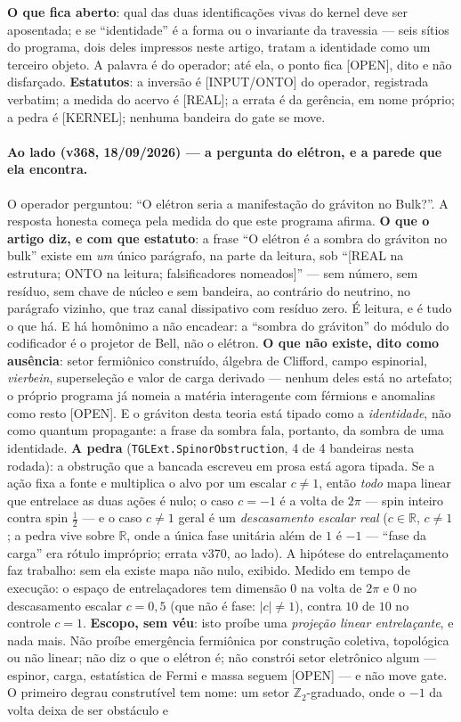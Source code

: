 \documentclass[11pt]{article}
\theoremstyle{definition}\newtheorem{deriv}{Derivação}
\begin{document}
\textbf{O que fica aberto}: qual das duas identificações vivas do kernel deve ser aposentada; e se ``identidade'' é a forma ou o invariante da travessia --- seis sítios do programa, dois deles impressos neste artigo, tratam a identidade como um terceiro objeto. A palavra é do operador; até ela, o ponto fica [OPEN], dito e não disfarçado. \textbf{Estatutos}: a inversão é [INPUT/ONTO] do operador, registrada verbatim; a medida do acervo é [REAL]; a errata é da gerência, em nome próprio; a pedra é [KERNEL]; nenhuma bandeira do gate se move.

\paragraph*{Ao lado (v368, 18/09/2026) --- a pergunta do elétron, e a parede que ela encontra.} O operador perguntou: ``O elétron seria a manifestação do gráviton no Bulk?''. A resposta honesta começa pela medida do que este programa afirma. \textbf{O que o artigo diz, e com que estatuto}: a frase ``O elétron é a sombra do gráviton no bulk'' existe em \emph{um} único parágrafo, na parte da leitura, sob ``[REAL na estrutura; ONTO na leitura; falsificadores nomeados]'' --- sem número, sem resíduo, sem chave de núcleo e sem bandeira, ao contrário do neutrino, no parágrafo vizinho, que traz canal dissipativo com resíduo zero. É leitura, e é tudo o que há. E há homônimo a não encadear: a ``sombra do gráviton'' do módulo do codificador é o projetor de Bell, não o elétron. \textbf{O que não existe, dito como ausência}: setor fermiônico construído, álgebra de Clifford, campo espinorial, \emph{vierbein}, superseleção e valor de carga derivado --- nenhum deles está no artefato; o próprio programa já nomeia a matéria interagente com férmions e anomalias como resto [OPEN]. E o gráviton desta teoria está tipado como a \emph{identidade}, não como quantum propagante: a frase da sombra fala, portanto, da sombra de uma identidade. \textbf{A pedra} (\texttt{TGLExt.SpinorObstruction}, 4 de 4 bandeiras nesta rodada): a obstrução que a bancada escreveu em prosa está agora tipada. Se a ação fixa a fonte e multiplica o alvo por um escalar $c\neq1$, então \emph{todo} mapa linear que entrelace as duas ações é nulo; o caso $c=-1$ é a volta de $2\pi$ --- spin inteiro contra spin $\tfrac{1}{2}$ --- e o caso $c\neq1$ geral é um \emph{descasamento escalar real} ($c\in\mathbb{R}$, $c\neq1$; a pedra vive sobre $\mathbb{R}$, onde a única fase unitária além de $1$ é $-1$ --- ``fase da carga'' era rótulo impróprio; errata v370, ao lado). A hipótese do entrelaçamento faz trabalho: sem ela existe mapa não nulo, exibido. Medido em tempo de execução: o espaço de entrelaçadores tem dimensão $0$ na volta de $2\pi$ e $0$ no descasamento escalar $c=0{,}5$ (que não é fase: $|c|\neq1$), contra $10$ de $10$ no controle $c=1$. \textbf{Escopo, sem véu}: isto proíbe uma \emph{projeção linear entrelaçante}, e nada mais. Não proíbe emergência fermiônica por construção coletiva, topológica ou não linear; não diz o que o elétron é; não constrói setor eletrônico algum --- espinor, carga, estatística de Fermi e massa seguem [OPEN] --- e não move gate. O primeiro degrau construtível tem nome: um setor $\mathbb{Z}_2$-graduado, onde o $-1$ da volta deixa de ser obstáculo e 
\end{document}
